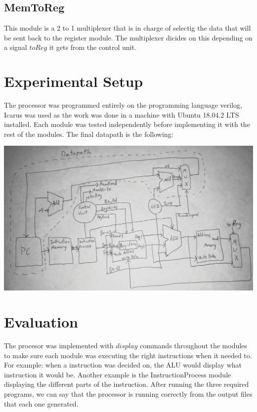 \documentclass[12pt,a4paper]{article}
\begin{document}
\subsection{MemToReg}
\text This module is a 2 to 1 multiplexer that is in charge of selectig the data that will be sent back to the register module. The multiplexer dicides on this depending on a signal $toReg$ it gets from the control unit.


\section{Experimental Setup}
\text The processor was programmed entirely on the programming language verilog, Icarus was used as the work was done in a machine with Ubuntu 18.04.2 LTS installed. Each module was tested independently before implementing it with the rest of the modules. The final datapath is the following:

\includegraphics[width=14cm]{./datapath.jpg}

\section{Evaluation}
The procesor was implemented with $display$ commands throughout the modules to make sure each module was executing the right instructions when it needed to. For example: when a instruction was decided on, the ALU would display what instruction it would be. Another example is the InstructionProcess module displaying the different parts of the instruction. After running the three required programs, we can say that the processor is running correctly from the output files that each one generated.
\end{document}
